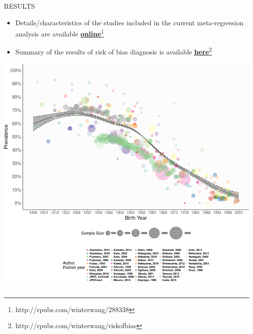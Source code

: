 \documentclass[english,xcolor=table,t
]{beamer}
\begin{document}
\begin{frame}
\begin{columns}
\begin{block}{RESULTS}
\begin{itemize}
\item
  Details/characteristics of the studies included in the current
  meta-regression analysis are available
  \href{http://rpubs.com/winterwang/288338}{\textbf{online}}\footnote{http://rpubs.com/winterwang/288338}
\item
  Summary of the results of risk of bias diagnosis is available
  \href{http://rpubs.com/winterwang/riskofbias}{\textbf{here}}\footnote{http://rpubs.com/winterwang/riskofbias}
\end{itemize}

\center
\caption{Figure 2: Multivariable adjusted prevalence of \textit{H. pylori} by birth year}
\includegraphics[width=1200pt]{images/Figure2Rev.png}


\end{block}
\end{columns}
\end{frame}
\end{document}
